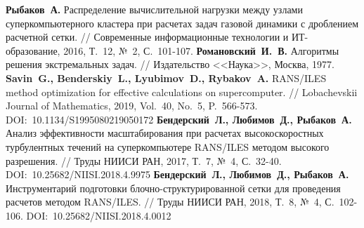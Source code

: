 \begin{thebibliography}{99}
\textbf{Рыбаков~А.} Распределение вычислительной нагрузки между узлами суперкомпьютерного кластера при расчетах задач газовой динамики с дроблением расчетной сетки. // Современные информационные технологии и ИТ-образование, 2016, Т.~12, №~2, С.~101-107.
\textbf{Романовский~И.~В.} Алгоритмы решения экстремальных задач. // Издательство <<Наука>>, Москва, 1977.
\textbf{Savin~G., Benderskiy~L., Lyubimov~D., Rybakov~A.} RANS/ILES method optimization for effective calculations on supercomputer. // Lobachevskii Journal of Mathematics, 2019, Vol.~40, No.~5, P.~566-573. DOI:~10.1134/S1995080219050172
\textbf{Бендерский~Л., Любимов~Д., Рыбаков~А.} Анализ эффективности масштабирования при расчетах высокоскоростных турбулентных течений на суперкомпьютере RANS/ILES методом высокого разрешения. // Труды НИИСИ РАН, 2017, Т.~7, №~4, С.~32-40. DOI:~10.25682/NIISI.2018.4.9975
\textbf{Бендерский~Л., Любимов~Д., Рыбаков~А.} Инструментарий подготовки блочно-структурированной сетки для проведения расчетов методом RANS/ILES. // Труды НИИСИ РАН, 2018, Т.~8, №~4, С.~102-106. DOI:~10.25682/NIISI.2018.4.0012


\end{thebibliography}
